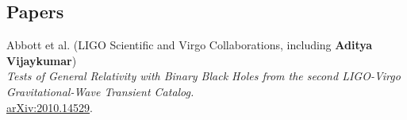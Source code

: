 \documentclass[margin, centered]{res}
\begin{document}
\begin{resume}
\begin{comment}
\section{Projects}
\begin{itemize}[leftmargin=*]
	\item \textbf{Aditya Vijaykumar}, MV Saketh, Sumit Kumar, Parameswaran Ajith, Tirthankar Roy Choudhury.\\
	\textit{Probing the cosmological large-scale structure using gravitational-wave observations} \\
	\textit{(manuscript under LIGO PnP review, to be submitted to arXiv soon)}
	\\
	\item \textbf{Aditya Vijaykumar}, Shasvath Kapadia, Parameswaran Ajith.\\
	\textit{Constraining the time-variation of the Gravitational constant using gravitational-wave observations of binary neutron stars} \\
	\textit{(manuscript under LIGO PnP review, to be submitted to arXiv soon)}
	\\
	\item \textbf{Aditya Vijaykumar}, Nathan Johnson-McDaniel, Rahul Kashyap, Arunava Mukherjee, Parameswaran Ajith.\\	
	\textit{Constraints on Black Hole Mimickers from the Gravitational-wave Transient Catalog (GWTC) -1 }
	\\
	\item Apratim Ganguly, \textbf{Aditya Vijaykumar}, Abhirup Ghosh, Parameswaran Ajith.\\	
	\textit{Probing General Relativity from the consistency of inspiral and merger-ringdown of Binary Black Holes}


\end{itemize}



\end{comment}

\section{Papers}
\begin{etaremune}
	
	\item Abbott et al. (LIGO Scientific and Virgo Collaborations, including \textbf{Aditya Vijaykumar})\\
	\textit{Tests of General Relativity with Binary Black Holes from the second LIGO-Virgo Gravitational-Wave Transient Catalog.}\\
	\href{https://arxiv.org/abs/2010.14529}{arXiv:2010.14529}.
	

\end{etaremune}
\end{resume}
\end{document}
